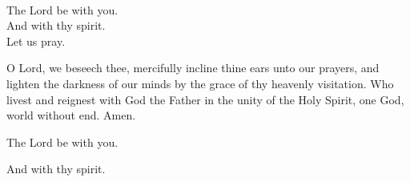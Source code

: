 \\
  \rubric{\Vbar}The Lord be with you.
\\
  \rubric{\Rbar}And with thy spirit.
\\
Let us pray.

O Lord, we beseech thee, mercifully incline thine ears unto our prayers, and lighten the darkness of our minds by the grace of thy heavenly visitation. Who livest and reignest with God the Father in the unity of the Holy Spirit, one God, world without end.\rubric{\Rbar} Amen.

  \rubric{\Vbar}The Lord be with you.

  \rubric{\Rbar}And with thy spirit.

